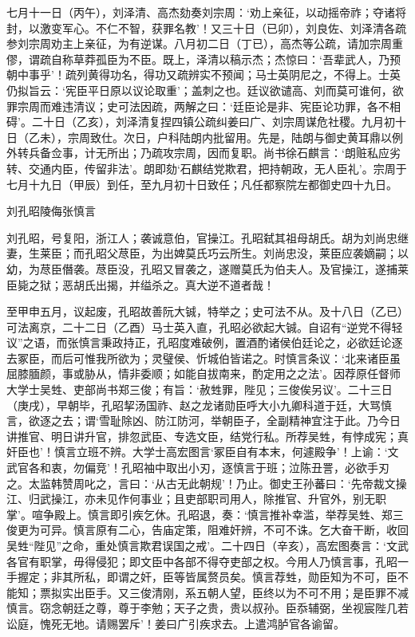 \documentclass[]{article}
\begin{document}
七月十一日（丙午），刘泽清、高杰劾奏刘宗周：`劝上亲征，以动摇帝祚；夺诸将封，以激变军心。不仁不智，获罪名教'！又三十日（已卯），刘良佐、刘泽清各疏参刘宗周劝主上亲征，为有逆谋。八月初二日（丁已），高杰等公疏，请加宗周重僇，谓疏自称草莽孤臣为不臣。既上，泽清以稿示杰；杰惊曰：`吾辈武人，乃预朝中事乎'！疏列黄得功名，得功又疏辨实不预闻；马士英阴尼之，不得上。士英仍拟旨云：`宪臣平日原以议论取重'；盖刺之也。廷议欲谴高、刘而莫可谁何，欲罪宗周而难违清议；史可法因疏，两解之曰：`廷臣论是非、宪臣论功罪，各不相碍'。二十日（乙亥），刘泽清复捏四镇公疏纠姜曰广、刘宗周谋危社稷。九月初十日（乙未），宗周致仕。次日，户科陆朗内批留用。先是，陆朗与御史黄耳鼎以例外转兵备佥事，计无所出；乃疏攻宗周，因而复职。尚书徐石麒言：`朗赃私应劣转、交通内臣，传留非法'。朗即劾`石麒结党欺君，把持朝政，无人臣礼'。宗周于七月十九日（甲辰）到任，至九月初十日致任；凡任都察院左都御史四十九日。

刘孔昭陵侮张慎言

刘孔昭，号复阳，浙江人；袭诚意伯，官操江。孔昭弑其祖母胡氏。胡为刘尚忠继妻，生莱臣；而孔昭父荩臣，为出婢莫氏巧云所生。刘尚忠没，莱臣应袭嫡嗣；以幼，为荩臣僭袭。荩臣没，孔昭又冒袭之，遂赠莫氏为伯夫人。及官操江，遂捕莱臣毙之狱；恶胡氏出揭，并缢杀之。真大逆不道者哉！

至甲申五月，议起废，孔昭故善阮大铖，特举之；史可法不从。及十八日（乙已）可法离京，二十二日（乙酉）马士英入直，孔昭必欲起大铖。自诏有``逆党不得轻议''之语，而张慎言秉政持正，孔昭度难破例，置酒酌诸侯伯廷论之，必欲廷论逐去冢臣，而后可惟我所欲为；灵璧侯、忻城伯皆诺之。时慎言条议：`北来诸臣虽屈膝腼颜，事或胁从，情非委顺；如能自拔南来，酌定用之之法'。因荐原任督师大学士吴甡、吏部尚书郑三俊；有旨：`赦甡罪，陛见；三俊俟另议'。二十三日（庚戌），早朝毕，孔昭挈汤国祚、赵之龙诸勋臣呼大小九卿科道于廷，大骂慎言，欲逐之去；谓`雪耻除凶、防江防河，举朝臣子，全副精神宜注于此。乃今日讲推官、明日讲升官，排忽武臣、专选文臣，结党行私。所荐吴甡，有悖成宪；真奸臣也'！慎言立班不辨。大学士高宏图言`冢臣自有本末，何遽殿争'！上谕：`文武官各和衷，勿偏竞'！孔昭袖中取出小刃，逐慎言于班；泣陈丑詈，必欲手刃之。太监韩赞周叱之，言曰：`从古无此朝规'！乃止。御史王孙蕃曰：`先帝裁文操江、归武操江，亦未见作何事业；且吏部职司用人，除推官、升官外，别无职掌'。喧争殿上。慎言即引疾乞休。孔昭退，奏：`慎言推补幸滥，举荐吴甡、郑三俊更为可异。慎言原有二心，告庙定策，阻难奸辨，不可不诛。乞大奋干断，收回吴甡``陛见''之命，重处慎言欺君误国之戒'。二十四日（辛亥），高宏图奏言：`文武各官有职掌，毋得侵犯；即文臣中各部不得夺吏部之权。今用人乃慎言事，孔昭一手握定；非其所私，即谓之奸，臣等皆属赘员矣。慎言荐甡，勋臣知为不可，臣不能知；票拟实出臣手。又三俊清刚，系五朝人望，臣终以为不可不用；是臣罪不减慎言。窃念朝廷之尊，尊于李勉；天子之贵，贵以叔孙。臣忝辅弼，坐视宸陛几若讼庭，愧死无地。请赐罢斥'！姜曰广引疾求去。上遣鸿胪官各谕留。
\end{document}
